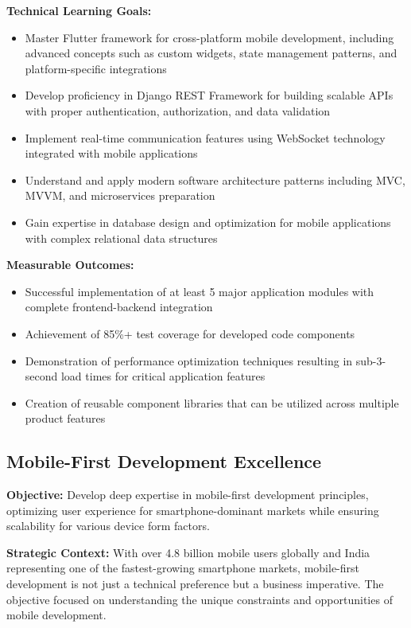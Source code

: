 \textbf{Technical Learning Goals:}
\begin{itemize}
    \item Master Flutter framework for cross-platform mobile development, including advanced concepts such as custom widgets, state management patterns, and platform-specific integrations
    \item Develop proficiency in Django REST Framework for building scalable APIs with proper authentication, authorization, and data validation
    \item Implement real-time communication features using WebSocket technology integrated with mobile applications
    \item Understand and apply modern software architecture patterns including MVC, MVVM, and microservices preparation
    \item Gain expertise in database design and optimization for mobile applications with complex relational data structures
\end{itemize}

\textbf{Measurable Outcomes:}
\begin{itemize}
    \item Successful implementation of at least 5 major application modules with complete frontend-backend integration
    \item Achievement of 85\%+ test coverage for developed code components
    \item Demonstration of performance optimization techniques resulting in sub-3-second load times for critical application features
    \item Creation of reusable component libraries that can be utilized across multiple product features
\end{itemize}

\subsection{Mobile-First Development Excellence}

\textbf{Objective:} Develop deep expertise in mobile-first development principles, optimizing user experience for smartphone-dominant markets while ensuring scalability for various device form factors.

\textbf{Strategic Context:} With over 4.8 billion mobile users globally and India representing one of the fastest-growing smartphone markets, mobile-first development is not just a technical preference but a business imperative. The objective focused on understanding the unique constraints and opportunities of mobile development.

